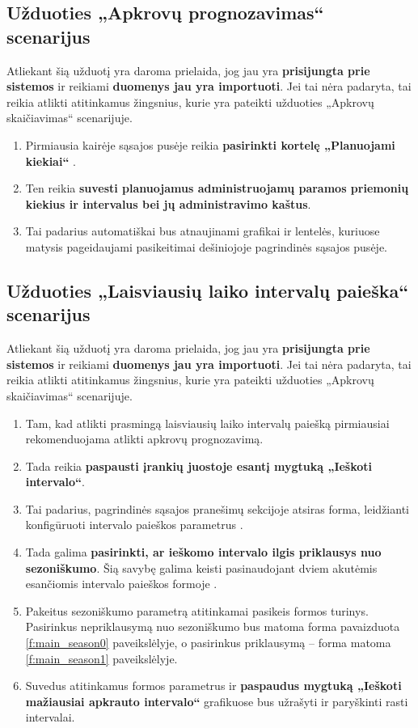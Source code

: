 
\subsection{Užduoties „Apkrovų prognozavimas“ scenarijus}

Atliekant šią užduotį yra daroma prielaida, jog jau yra
\textbf{prisijungta prie sistemos} ir reikiami \textbf{duomenys jau yra
importuoti}. Jei tai nėra padaryta, tai reikia atlikti atitinkamus
žingsnius, kurie yra pateikti užduoties „Apkrovų skaičiavimas“
scenarijuje.

\begin{enumerate}
  \item Pirmiausia kairėje sąsajos pusėje reikia \textbf{pasirinkti
    kortelę „Planuojami kiekiai“} .
  \item Ten reikia \textbf{suvesti planuojamus administruojamų paramos
    priemonių kiekius ir intervalus bei jų administravimo kaštus}.
  \item Tai padarius automatiškai bus atnaujinami grafikai ir
    lentelės, kuriuose matysis pageidaujami pasikeitimai dešiniojoje
    pagrindinės sąsajos  pusėje.
\end{enumerate}

\subsection{Užduoties „Laisviausių laiko intervalų paieška“ scenarijus}

Atliekant šią užduotį yra daroma prielaida, jog jau yra
\textbf{prisijungta prie sistemos} ir reikiami \textbf{duomenys jau
yra importuoti}. Jei tai nėra padaryta, tai reikia atlikti atitinkamus
žingsnius, kurie yra pateikti užduoties „Apkrovų skaičiavimas“
scenarijuje.

\begin{enumerate}
  \item Tam, kad atlikti prasmingą laisviausių laiko intervalų
    paiešką pirmiausiai rekomenduojama atlikti apkrovų prognozavimą.
  \item Tada reikia \textbf{paspausti įrankių juostoje 
    esantį mygtuką „Ieškoti intervalo“}.
  \item Tai padarius, pagrindinės sąsajos pranešimų sekcijoje
    atsiras forma, leidžianti konfigūruoti intervalo paieškos
    parametrus .
  \item Tada galima \textbf{pasirinkti, ar ieškomo intervalo ilgis
    priklausys nuo sezoniškumo}. Šią savybę galima keisti
    pasinaudojant dviem akutėmis esančiomis intervalo paieškos
    formoje .
  \item Pakeitus sezoniškumo parametrą atitinkamai pasikeis formos
    turinys. Pasirinkus nepriklausymą nuo sezoniškumo bus matoma forma
    pavaizduota \ref{f:main_season0} paveikslėlyje, o pasirinkus 
    priklausymą – forma matoma \ref{f:main_season1} paveikslėlyje.
  \item Suvedus atitinkamus formos parametrus ir \textbf{paspaudus
    mygtuką „Ieškoti mažiausiai apkrauto intervalo“} grafikuose bus
    užrašyti ir paryškinti rasti intervalai.
\end{enumerate}
